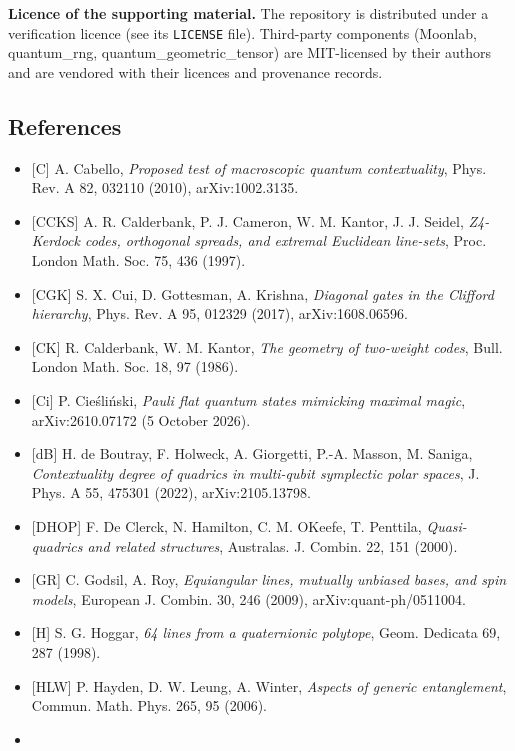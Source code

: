 \documentclass[11pt,a4paper]{article}
\providecommand{\tightlist}{\setlength{\itemsep}{0pt}\setlength{\parskip}{0pt}}
\begin{document}
\textbf{Licence of the supporting material.} The repository is distributed under a verification licence (see its \texttt{LICENSE} file).
Third-party components (Moonlab, quantum\_rng, quantum\_geometric\_tensor) are MIT-licensed by their
authors and are vendored with their licences and provenance records.

\subsection{References}\label{references}

\begin{itemize}
\tightlist
\item
  {[}C{]} A. Cabello, \emph{Proposed test of macroscopic quantum contextuality}, Phys. Rev. A 82, 032110 (2010), arXiv:1002.3135.
\item
  {[}CCKS{]} A. R. Calderbank, P. J. Cameron, W. M. Kantor, J. J. Seidel, \emph{Z4-Kerdock codes, orthogonal spreads, and extremal Euclidean line-sets}, Proc. London Math. Soc. 75, 436 (1997).
\item
  {[}CGK{]} S. X. Cui, D. Gottesman, A. Krishna, \emph{Diagonal gates in the Clifford hierarchy}, Phys. Rev. A 95, 012329 (2017), arXiv:1608.06596.
\item
  {[}CK{]} R. Calderbank, W. M. Kantor, \emph{The geometry of two-weight codes}, Bull. London Math. Soc. 18, 97 (1986).
\item
  {[}Ci{]} P. Cieśliński, \emph{Pauli flat quantum states mimicking maximal magic}, arXiv:2610.07172 (5 October 2026).
\item
  {[}dB{]} H. de Boutray, F. Holweck, A. Giorgetti, P.-A. Masson, M. Saniga, \emph{Contextuality degree of quadrics in multi-qubit symplectic polar spaces}, J. Phys. A 55, 475301 (2022), arXiv:2105.13798.
\item
  {[}DHOP{]} F. De Clerck, N. Hamilton, C. M. O\textquotesingle Keefe, T. Penttila, \emph{Quasi-quadrics and related structures}, Australas. J. Combin. 22, 151 (2000).
\item
  {[}GR{]} C. Godsil, A. Roy, \emph{Equiangular lines, mutually unbiased bases, and spin models}, European J. Combin. 30, 246 (2009), arXiv:quant-ph/0511004.
\item
  {[}H{]} S. G. Hoggar, \emph{64 lines from a quaternionic polytope}, Geom. Dedicata 69, 287 (1998).
\item
  {[}HLW{]} P. Hayden, D. W. Leung, A. Winter, \emph{Aspects of generic entanglement}, Commun. Math. Phys. 265, 95 (2006).
\item

\end{itemize}
\end{document}
